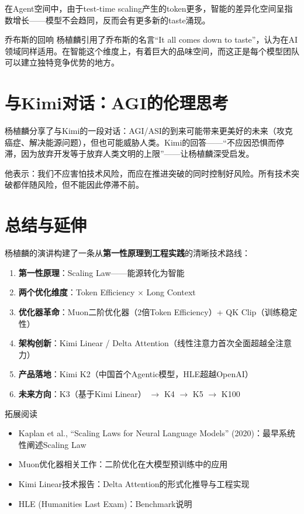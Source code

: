 \documentclass[a4paper]{article}
\begin{document}
在Agent空间中，由于test-time scaling产生的token更多，智能的差异化空间呈指数增长——模型不会趋同，反而会有更多新的taste涌现。

\begin{knowledgebox}{乔布斯的回响}
杨植麟引用了乔布斯的名言``It all comes down to taste''，认为在AI领域同样适用。在智能这个维度上，有着巨大的品味空间，而这正是每个模型团队可以建立独特竞争优势的地方。
\end{knowledgebox}


\section{与Kimi对话：AGI的伦理思考}

杨植麟分享了与Kimi的一段对话：AGI/ASI的到来可能带来更美好的未来（攻克癌症、解决能源问题），但也可能威胁人类。Kimi的回答——``不应因恐惧而停滞，因为放弃开发等于放弃人类文明的上限''——让杨植麟深受启发。

他表示：我们不应害怕技术风险，而应在推进突破的同时控制好风险。所有技术突破都伴随风险，但不能因此停滞不前。


\section{总结与延伸}

杨植麟的演讲构建了一条从\textbf{第一性原理到工程实践}的清晰技术路线：

\begin{enumerate}
\item \textbf{第一性原理}：Scaling Law——能源转化为智能
\item \textbf{两个优化维度}：Token Efficiency $\times$ Long Context
\item \textbf{优化器革命}：Muon二阶优化器（2倍Token Efficiency）+ QK Clip（训练稳定性）
\item \textbf{架构创新}：Kimi Linear / Delta Attention（线性注意力首次全面超越全注意力）
\item \textbf{产品落地}：Kimi K2（中国首个Agentic模型，HLE超越OpenAI）
\item \textbf{未来方向}：K3（基于Kimi Linear） $\rightarrow$ K4 $\rightarrow$ K5 $\rightarrow$ K100
\end{enumerate}

\begin{knowledgebox}{拓展阅读}
\begin{itemize}
\item Kaplan et al., ``Scaling Laws for Neural Language Models'' (2020)：最早系统性阐述Scaling Law
\item Muon优化器相关工作：二阶优化在大模型预训练中的应用
\item Kimi Linear技术报告：Delta Attention的形式化推导与工程实现
\item HLE (Humanities Last Exam)：Benchmark说明
\end{itemize}
\end{knowledgebox}

\end{document}
